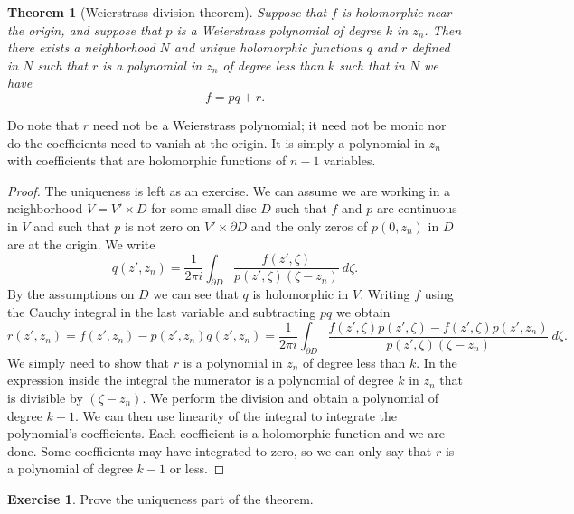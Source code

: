 \documentclass[12pt,openany]{book}
\newcommand{\myindex}[1]{#1\index{#1}}
\theoremstyle{plain}
\newtheorem{thm}{Theorem}[section]
\theoremstyle{remark}
\theoremstyle{definition}
\theoremstyle{exercise}
\newtheorem{exercise}{Exercise}[section]
\theoremstyle{example}
\begin{document}
\begin{thm}[\myindex{Weierstrass division theorem}]
Suppose that $f$ is holomorphic near the origin, and suppose that $p$
is a Weierstrass polynomial of degree $k$ in $z_n$.  Then there exists
a neighborhood $N$ and unique holomorphic functions $q$ and $r$
defined in $N$ such that $r$ is a polynomial in $z_n$ of degree less than $k$
such that in $N$ we have
\begin{equation*}
f = pq + r .
\end{equation*}
\end{thm}

Do note that $r$ need not be a Weierstrass polynomial; it need not be monic
nor do the coefficients need to vanish at the origin.  It is simply a
polynomial in $z_n$ with coefficients that are holomorphic functions
of $n-1$ variables.

\begin{proof}
The uniqueness is left as an exercise.  We can assume we are working
in a neighborhood $V = V' \times D$ for some small disc $D$
such that $f$ and $p$ are continuous in $\overline{V}$ and
such that $p$ is not zero on $V' \times \partial D$ and the
only zeros of $p(0,z_n)$ in $D$ are at the origin.  We write
\begin{equation}
q(z',z_n) =
\frac{1}{2\pi i} \int_{\partial D} \frac{f(z',\zeta)}{p(z',\zeta)(\zeta-z_n)}
~d\zeta .
\end{equation}
By the assumptions on $D$ we can see that $q$ is holomorphic in $V$. 
Writing $f$ using the Cauchy integral in the last variable and
subtracting $pq$ we obtain
\begin{equation}
r(z',z_n) = f(z',z_n) - p(z',z_n)q(z',z_n)
=
\frac{1}{2\pi i}
\int_{\partial D} \frac{f(z',\zeta)p(z',\zeta) - f(z',\zeta)p(z',z_n)}{p(z',\zeta)(\zeta-z_n)}
~d\zeta .
\end{equation}
We simply need to show that $r$ is a polynomial in $z_n$ of degree less than
$k$.  In the expression inside the integral the numerator is
a polynomial of degree $k$ in $z_n$ that is divisible
by $(\zeta-z_n)$.  We perform the division and obtain a polynomial
of degree $k-1$.  We can then use linearity of the integral
to integrate the polynomial's coefficients.  Each coefficient is a
holomorphic function and we are done.  Some coefficients may have
integrated to zero, so we can only say that $r$ is a polynomial
of degree $k-1$ or less.
\end{proof}

\begin{exercise}
Prove the uniqueness part of the theorem.
\end{exercise}
\end{document}
